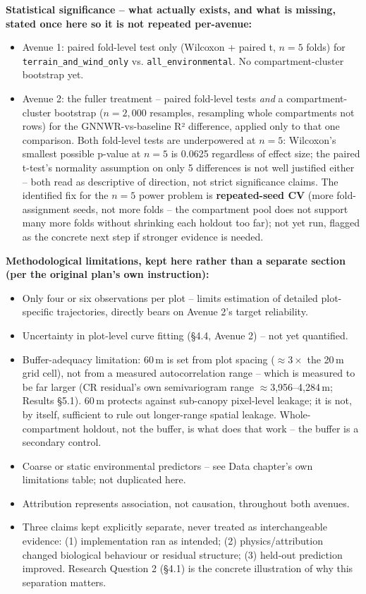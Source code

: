 \documentclass[11pt,a4paper]{report}
\begin{document}
\textbf{Statistical significance -- what actually exists, and what is missing, stated once here so
it is not repeated per-avenue:}
\begin{itemize}
\setlength\itemsep{0pt}
\item Avenue 1: paired fold-level test only (Wilcoxon + paired t, $n=5$ folds) for
\texttt{terrain\_and\_wind\_only} vs. \texttt{all\_environmental}. No compartment-cluster
bootstrap yet.
\item Avenue 2: the fuller treatment -- paired fold-level tests \emph{and} a compartment-cluster
bootstrap ($n=2{,}000$ resamples, resampling whole compartments not rows) for the GNNWR-vs-baseline
R² difference, applied only to that one comparison. Both fold-level tests are underpowered at
$n=5$: Wilcoxon's smallest possible p-value at $n=5$ is 0.0625 regardless of effect size; the
paired t-test's normality assumption on only 5 differences is not well justified either -- both
read as descriptive of direction, not strict significance claims. The identified fix for the
$n=5$ power problem is \textbf{repeated-seed CV} (more fold-assignment seeds, not more folds --
the compartment pool does not support many more folds without shrinking each holdout too far);
not yet run, flagged as the concrete next step if stronger evidence is needed.
\end{itemize}

\textbf{Methodological limitations, kept here rather than a separate section (per the original
plan's own instruction):}
\begin{itemize}
\setlength\itemsep{0pt}
\item Only four or six observations per plot -- limits estimation of detailed plot-specific
trajectories, directly bears on Avenue 2's target reliability.
\item Uncertainty in plot-level curve fitting (\S4.4, Avenue 2) -- not yet quantified.
\item Buffer-adequacy limitation: 60\,m is set from plot spacing ($\approx3\times$ the 20\,m grid
cell), not from a measured autocorrelation range -- which is measured to be far larger (CR
residual's own semivariogram range $\approx$3,956--4,284\,m; Results \S5.1). 60\,m protects
against sub-canopy pixel-level leakage; it is not, by itself, sufficient to rule out longer-range
spatial leakage. Whole-compartment holdout, not the buffer, is what does that work -- the buffer is
a secondary control.
\item Coarse or static environmental predictors -- see Data chapter's own limitations table; not
duplicated here.
\item Attribution represents association, not causation, throughout both avenues.
\item Three claims kept explicitly separate, never treated as interchangeable evidence: (1)
implementation ran as intended; (2) physics/attribution changed biological behaviour or residual
structure; (3) held-out prediction improved. Research Question 2 (\S4.1) is the concrete
illustration of why this separation matters.
\end{itemize}
\end{document}
